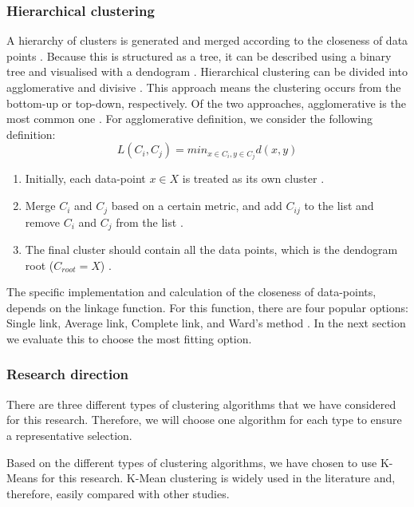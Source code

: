 \subsubsection{Hierarchical clustering}
A hierarchy of clusters is generated and merged according to the closeness of data points \citep{meng_private_2021}. Because this is structured as a tree, it can be described using a binary tree and visualised with a dendogram  \citep{nielsen_hierarchical_2016}.
Hierarchical clustering can be divided into agglomerative and divisive \citep{meng_private_2021}.
This approach means the clustering occurs from the bottom-up or top-down, respectively.
Of the two approaches, agglomerative is the most common one \citep{meng_private_2021}.
For  agglomerative definition, we consider the following definition:
\begin{equation}
  L(C_i, C_j) = min_{x \in C_i, y \in C_j} d(x, y)
\end{equation}
\begin{enumerate}
  \item Initially, each data-point $x \in X$ is treated as its own cluster \citep{nielsen_hierarchical_2016}.
  \item Merge $C_i$ and $C_j$ based on a certain metric, and add $C_{ij}$ to the list and remove $C_i$ and $C_j$ from the list \citep{nielsen_hierarchical_2016}.
  \item The final cluster should contain all the data points, which is the dendogram root ($C_{root} = X$) \citep{nielsen_hierarchical_2016}.
\end{enumerate}
The specific implementation and calculation of the closeness of data-points, depends on the linkage function.
For this function, there are four popular options: Single link, Average link, Complete link, and Ward's method \citep{roux_comparative_2015}. In the next section we evaluate this to choose the most fitting option.

\subsubsection{Research direction}
There are three different types of clustering algorithms that we have considered for this research.
Therefore, we will choose one algorithm for each type to ensure a representative selection.

Based on the different types of clustering algorithms, we have chosen to use K-Means for this research.
K-Mean clustering is widely used in the literature and, therefore, easily compared with other studies.

